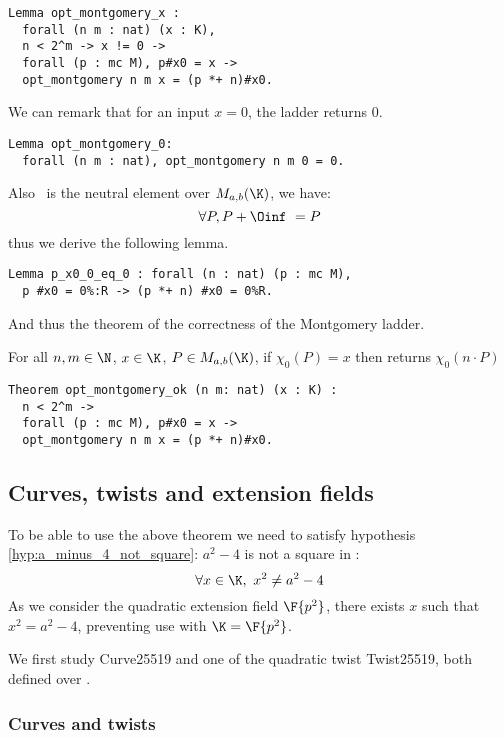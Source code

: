 
\begin{lstlisting}[language=Coq]
Lemma opt_montgomery_x :
  forall (n m : nat) (x : K),
  n < 2^m -> x != 0 ->
  forall (p : mc M), p#x0 = x ->
  opt_montgomery n m x = (p *+ n)#x0.
\end{lstlisting}
We can remark that for an input $x = 0$, the ladder returns $0$.
\begin{lstlisting}[language=Coq]
Lemma opt_montgomery_0:
  forall (n m : nat), opt_montgomery n m 0 = 0.
\end{lstlisting}
Also \Oinf\ is the neutral element over $M_{a,b}(\K)$, we have:
$$\forall P, P + \Oinf\ = P$$
thus we derive the following lemma.
\begin{lstlisting}[language=Coq]
Lemma p_x0_0_eq_0 : forall (n : nat) (p : mc M),
  p #x0 = 0%:R -> (p *+ n) #x0 = 0%R.
\end{lstlisting}
And thus the theorem of the correctness of the Montgomery ladder.
\begin{theorem}
\label{thm:montgomery-ladder-correct}
For all $n, m \in \N$, $x \in \K$, $P \in M_{a,b}(\K)$,
if $\chi_0(P) = x$ then  returns $\chi_0(n \cdot P)$
\end{theorem}
\begin{lstlisting}[language=Coq]
Theorem opt_montgomery_ok (n m: nat) (x : K) :
  n < 2^m ->
  forall (p : mc M), p#x0 = x ->
  opt_montgomery n m x = (p *+ n)#x0.
\end{lstlisting}

\subsection{Curves, twists and extension fields}

To be able to use the above theorem we need to satisfy hypothesis
\ref{hyp:a_minus_4_not_square}: $a^2-4$ is not a square in \K:
$$\forall x \in \K,\ x^2 \neq a^2-4$$
As we consider the quadratic extension field $\F{p^2}$,
there exists $x$ such that $x^2 = a^2-4$, preventing use 
with $\K = \F{p^2}$.

We first study Curve25519 and one of the quadratic twist Twist25519, both defined
over .

\subsubsection{Curves and twists}
\label{subsec:Zmodp}

